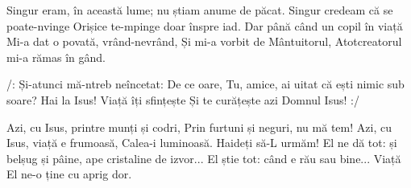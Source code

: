 \beginverse
Singur eram, în această lume; nu știam anume de păcat.
Singur credeam că se poate-nvinge
Orișice te-mpinge doar înspre iad.
Dar până când un copil în viață
Mi-a dat o povată, vrând-nevrând,
Și mi-a vorbit de Mântuitorul,
Atotcreatorul mi-a rămas în gând.
\endverse

\beginchorus
/: Și-atunci mă-ntreb neîncetat: De ce oare,
Tu, amice, ai uitat că ești nimic sub soare?
Hai la Isus! Viață îți sfințește
Și te curățește azi Domnul Isus! :/
\endchorus

\beginverse
Azi, cu Isus, printre munți și codri,
Prin furtuni și neguri, nu mă tem!
Azi, cu Isus, viață e frumoasă,
Calea-i luminoasă. Haideți să-L urmăm!
El ne dă tot: și belșug și pâine, ape cristaline de izvor...
El știe tot: când e rău sau bine...
Viață El ne-o ține cu aprig dor.
\endverse
\endsong